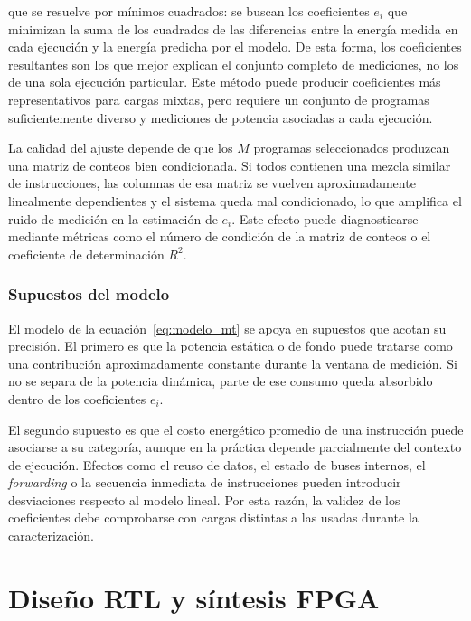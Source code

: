 que se resuelve por mínimos cuadrados: se buscan los coeficientes $e_i$ que
minimizan la suma de los cuadrados de las diferencias entre la energía medida
en cada ejecución y la energía predicha por el modelo. De esta forma, los
coeficientes resultantes son los que mejor explican el conjunto completo de
mediciones, no los de una sola ejecución particular. Este método puede producir
coeficientes más representativos para cargas mixtas,
pero requiere un conjunto de programas suficientemente diverso y mediciones de
potencia asociadas a cada ejecución.

La calidad del ajuste depende de que los $M$ programas seleccionados produzcan
una matriz de conteos bien condicionada. Si todos contienen una mezcla similar
de instrucciones, las columnas de esa matriz se vuelven aproximadamente
linealmente dependientes y el sistema queda mal condicionado, lo que amplifica
el ruido de medición en la estimación de $e_i$. Este efecto puede diagnosticarse mediante métricas como el número de condición
de la matriz de conteos o el coeficiente de determinación $R^2$.

\subsubsection*{Supuestos del modelo}

El modelo de la ecuación~\ref{eq:modelo_mt} se apoya en supuestos que acotan
su precisión. El primero es que la potencia estática o de fondo puede tratarse como una
contribución aproximadamente constante durante la ventana de medición. Si no se
separa de la potencia dinámica, parte de ese consumo queda absorbido dentro de
los coeficientes $e_i$.

El segundo supuesto es que el costo energético promedio de una instrucción puede
asociarse a su categoría, aunque en la práctica depende parcialmente del
contexto de ejecución. Efectos como el reuso de datos, el estado de buses
internos, el \emph{forwarding} o la secuencia inmediata de instrucciones pueden
introducir desviaciones respecto al modelo lineal. Por esta razón, la validez
de los coeficientes debe comprobarse con cargas distintas a las usadas durante
la caracterización.


\section{Diseño RTL y síntesis FPGA}
\label{sec:implementacion}

